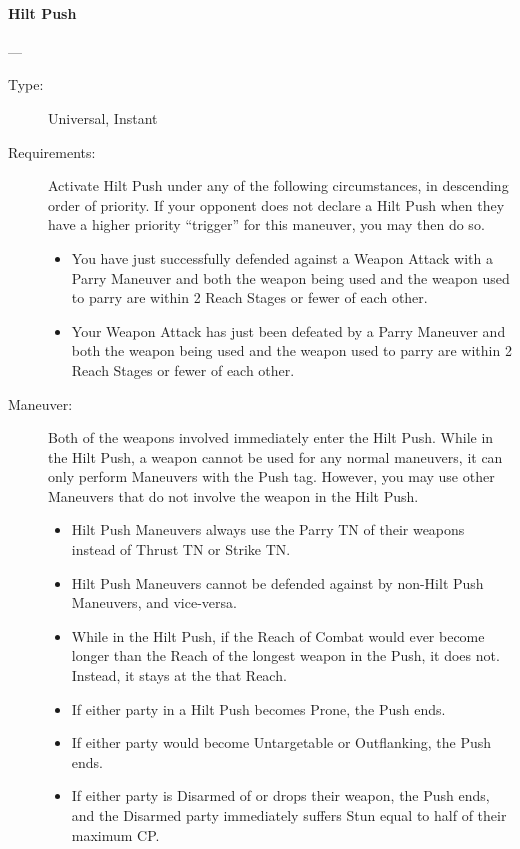 \documentclass[oneside,11pt,english]{book}
\begin{document}
\paragraph{\large\label{man:Hilt Push}Hilt Push}---\quad{\large[2]}
\vspace{-10pt}\begin{description}
\item [Type:] Universal, Instant 
\item [Requirements:] Activate Hilt Push under any of the following circumstances, in descending order of 
priority. If your opponent does not declare a Hilt Push when they have a higher priority “trigger” for this 
maneuver, you may then do so.
	\begin{itemize}
		\item You have just successfully defended against a Weapon Attack with a Parry Maneuver and both the 
weapon being used and the weapon used to parry are within 2 Reach Stages or fewer of each other. 
		\item Your Weapon Attack has just been defeated by a Parry Maneuver and both the weapon being used and 
the weapon used to parry are within 2 Reach Stages or fewer of each other.
	\end{itemize}
\item [Maneuver:] Both of the weapons involved immediately enter the Hilt Push. 
While in the Hilt Push, a weapon cannot be used for any normal maneuvers, it can only perform 
Maneuvers with the Push tag. However, you may use other Maneuvers that do not involve the weapon in 
the Hilt Push.
	\begin{itemize}
		\item Hilt Push Maneuvers always use the Parry TN of their weapons instead of Thrust TN or Strike TN. 
		\item Hilt Push Maneuvers cannot be defended against by non-Hilt Push Maneuvers, and vice-versa. 
		\item While in the Hilt Push, if the Reach of Combat would ever become longer than the Reach of the longest 
weapon in the Push, it does not. Instead, it stays at the that Reach. 
		\item If either party in a Hilt Push becomes Prone, the Push ends. 
		\item If either party would become Untargetable or Outflanking, the Push ends. 
		\item If either party is Disarmed of or drops their weapon, the Push ends, and the Disarmed party immediately 
suffers Stun equal to half of their maximum CP. 

\end{itemize}
\end{description}
\end{document}
